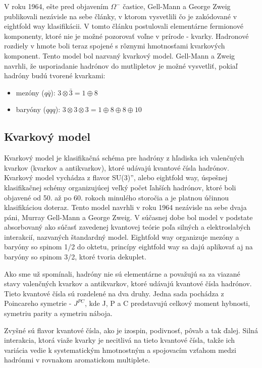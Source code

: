 \documentclass[../../main.tex]{subfiles}
\begin{document}
V roku 1964, ešte pred objavením $\Omega^{-}$ častice, Gell-Mann a George Zweig publikovali nezávisle na sebe články, v ktorom vysvetlili čo je zakódované v eightfold way klasifikácii. V tomto článku postulovali elementárne fermionové komponenty, ktoré nie je možné pozorovať voľne v prírode - kvarky. Hadronové rozdiely v hmote boli teraz spojené s rôznymi hmotnosťami kvarkových komponent. Tento model bol nazvaný kvarkový model. Gell-Mann a Zweig navrhli, že usporiadanie hadrónov do mutlipletov je možné vysvetliť, pokiaľ hadróny budú tvorené kvarkami:
\begin{itemize}
\item mezóny ($q\bar{q}$): $3\otimes \bar{3}=1\oplus 8$
\item baryóny ($qqq$): $3 \otimes 3 \otimes 3 = 1 \oplus 8 \oplus 8 \oplus 10$  
\end{itemize}

\subsection{Kvarkový model}
Kvarkový model je klasifikačná schéma pre hadróny z hľadiska ich valenčných kvarkov (kvarkov a antikvarkov), ktoré udávajú kvantové čísla hadrónov. Kvarkový model vychádza z \quotedblbase flavor SU(3)\textquotedblright , alebo eightfold way, úspešnej klasifikačnej schémy organizujúcej veľký počet ľahších hadrónov, ktoré boli objavené od 50. až po 60. rokoch minulého storočia a je platnou účinnou klasifikáciou doteraz. Tento model navrhli v roku 1964 nezávisle na sebe dvaja páni, Murray Gell-Mann a George Zweig. V súčasnej dobe bol model v podstate absorbovaný ako súčasť zavedenej kvantovej teórie poľa silných a elektroslabých interakcií, nazvaných štandardný model. Eightfold way organizuje mezóny a baryóny so spinom 1/2 do oktetu, princípy eightfold way sa dajú aplikovať aj na baryóny so spinom 3/2, ktoré tvoria dekuplet.

Ako sme už spomínali, hadróny nie sú elementárne a považujú sa za viazané stavy valenčných kvarkov a antikvarkov, ktoré udávajú kvantové čísla hadrónov. Tieto kvantové čísla sú rozdelené na dva druhy. Jedna sada pochádza z Poincareho symetrie - $J^{PC}$, kde J, P a C predstavujú celkový moment hybnosti, symetriu parity a symetriu náboja. 

Zvyšné sú flavor kvantové čísla, ako je izospin, podivnosť, pôvab a tak ďalej. Silná interakcia, ktorá viaže kvarky je necitlivá na tieto kvantové čísla, takže ich variácia vedie k systematickým hmotnostným a spojovacím vzťahom medzi hadrónmi v rovnakom aromatickom multiplete.
\end{document}
